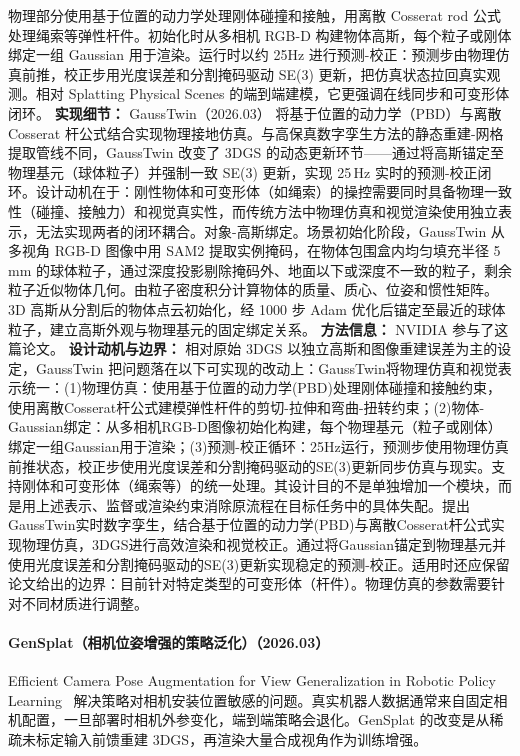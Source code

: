 物理部分使用基于位置的动力学处理刚体碰撞和接触，用离散 Cosserat rod 公式处理绳索等弹性杆件。初始化时从多相机 RGB-D 构建物体高斯，每个粒子或刚体绑定一组 Gaussian 用于渲染。运行时以约 25Hz 进行预测-校正：预测步由物理仿真前推，校正步用光度误差和分割掩码驱动 SE(3) 更新，把仿真状态拉回真实观测。相对 Splatting Physical Scenes 的端到端建模，它更强调在线同步和可变形体闭环。
\textbf{实现细节：} GaussTwin（2026.03） 将基于位置的动力学（PBD）与离散 Cosserat 杆公式结合实现物理接地仿真。与高保真数字孪生方法的静态重建-网格提取管线不同，GaussTwin 改变了 3DGS 的动态更新环节——通过将高斯锚定至物理基元（球体粒子）并强制一致 SE(3) 更新，实现 25\,Hz 实时的预测-校正闭环。设计动机在于：刚性物体和可变形体（如绳索）的操控需要同时具备物理一致性（碰撞、接触力）和视觉真实性，而传统方法中物理仿真和视觉渲染使用独立表示，无法实现两者的闭环耦合。对象-高斯绑定。场景初始化阶段，GaussTwin 从多视角 RGB-D 图像中用 SAM2 提取实例掩码，在物体包围盒内均匀填充半径 5\,mm 的球体粒子，通过深度投影剔除掩码外、地面以下或深度不一致的粒子，剩余粒子近似物体几何。由粒子密度积分计算物体的质量、质心、位姿和惯性矩阵。3D 高斯从分割后的物体点云初始化，经 1000 步 Adam 优化后锚定至最近的球体粒子，建立高斯外观与物理基元的固定绑定关系。
\textbf{方法信息：} NVIDIA 参与了这篇论文。
\textbf{设计动机与边界：} 相对原始 3DGS 以独立高斯和图像重建误差为主的设定，GaussTwin 把问题落在以下可实现的改动上：GaussTwin将物理仿真和视觉表示统一：(1)物理仿真：使用基于位置的动力学(PBD)处理刚体碰撞和接触约束，使用离散Cosserat杆公式建模弹性杆件的剪切-拉伸和弯曲-扭转约束；(2)物体-Gaussian绑定：从多相机RGB-D图像初始化构建，每个物理基元（粒子或刚体）绑定一组Gaussian用于渲染；(3)预测-校正循环：25Hz运行，预测步使用物理仿真前推状态，校正步使用光度误差和分割掩码驱动的SE(3)更新同步仿真与现实。支持刚体和可变形体（绳索等）的统一处理。其设计目的不是单独增加一个模块，而是用上述表示、监督或渲染约束消除原流程在目标任务中的具体失配。提出GaussTwin实时数字孪生，结合基于位置的动力学(PBD)与离散Cosserat杆公式实现物理仿真，3DGS进行高效渲染和视觉校正。通过将Gaussian锚定到物理基元并使用光度误差和分割掩码驱动的SE(3)更新实现稳定的预测-校正。适用时还应保留论文给出的边界：目前针对特定类型的可变形体（杆件）。物理仿真的参数需要针对不同材质进行调整。
\paragraph{GenSplat（相机位姿增强的策略泛化）（2026.03）}
Efficient Camera Pose Augmentation for View Generalization in Robotic Policy Learning~\cite{2603_29192} 解决策略对相机安装位置敏感的问题。真实机器人数据通常来自固定相机配置，一旦部署时相机外参变化，端到端策略会退化。GenSplat 的改变是从稀疏未标定输入前馈重建 3DGS，再渲染大量合成视角作为训练增强。

